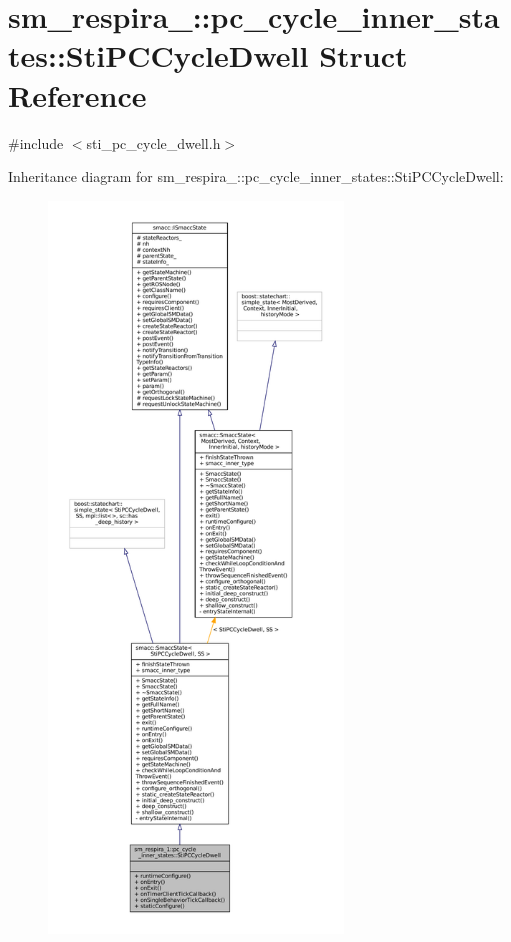 \hypertarget{structsm__respira__1_1_1pc__cycle__inner__states_1_1StiPCCycleDwell}{}\section{sm\+\_\+respira\+\_\+:\+:pc\+\_\+cycle\+\_\+inner\+\_\+states\+:\+:Sti\+P\+C\+Cycle\+Dwell Struct Reference}
\label{structsm__respira__1_1_1pc__cycle__inner__states_1_1StiPCCycleDwell}


{\ttfamily \#include $<$sti\+\_\+pc\+\_\+cycle\+\_\+dwell.\+h$>$}



Inheritance diagram for sm\+\_\+respira\+\_\+:\+:pc\+\_\+cycle\+\_\+inner\+\_\+states\+:\+:Sti\+P\+C\+Cycle\+Dwell\+:
\nopagebreak
\begin{figure}[H]
\begin{center}
\leavevmode
\includegraphics[height=550pt]{structsm__respira__1_1_1pc__cycle__inner__states_1_1StiPCCycleDwell__inherit__graph}
\end{center}
\end{figure}


